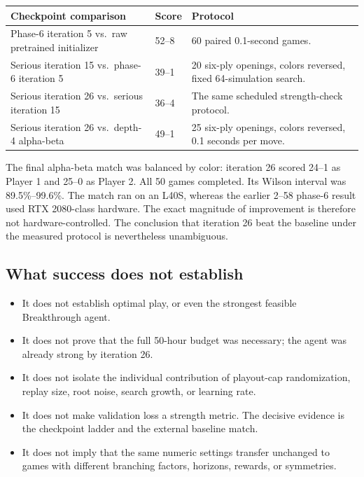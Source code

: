\documentclass[10.5pt,letterpaper]{article}
\begin{document}
\begin{center}
\small
\begin{tabularx}{\textwidth}{Y L{0.12\textwidth} Y}
\toprule
\sffamily\bfseries Checkpoint comparison &
\sffamily\bfseries Score &
\sffamily\bfseries Protocol \\
\midrule
Phase-6 iteration 5 vs.\ raw pretrained initializer &
52--8 &
60 paired 0.1-second games. \\
\addlinespace[2pt]
Serious iteration 15 vs.\ phase-6 iteration 5 &
39--1 &
20 six-ply openings, colors reversed, fixed 64-simulation search. \\
\addlinespace[2pt]
Serious iteration 26 vs.\ serious iteration 15 &
36--4 &
The same scheduled strength-check protocol. \\
\addlinespace[2pt]
Serious iteration 26 vs.\ depth-4 alpha-beta &
49--1 &
25 six-ply openings, colors reversed, 0.1 seconds per move. \\
\bottomrule
\end{tabularx}
\end{center}

The final alpha-beta match was balanced by color: iteration 26 scored 24--1 as
Player 1 and 25--0 as Player 2. All 50 games completed. Its Wilson interval was
89.5\%--99.6\%. The match ran on an L40S, whereas the earlier 2--58 phase-6
result used RTX 2080-class hardware. The exact magnitude of improvement is
therefore not hardware-controlled. The conclusion that iteration 26 beat the
baseline under the measured protocol is nevertheless unambiguous.

\subsection*{What success does not establish}
\begin{itemize}
  \item It does not establish optimal play, or even the strongest feasible
        Breakthrough agent.
  \item It does not prove that the full 50-hour budget was necessary; the agent
        was already strong by iteration 26.
  \item It does not isolate the individual contribution of playout-cap
        randomization, replay size, root noise, search growth, or learning rate.
  \item It does not make validation loss a strength metric. The decisive
        evidence is the checkpoint ladder and the external baseline match.
  \item It does not imply that the same numeric settings transfer unchanged to
        games with different branching factors, horizons, rewards, or
        symmetries.
\end{itemize}
\end{document}
